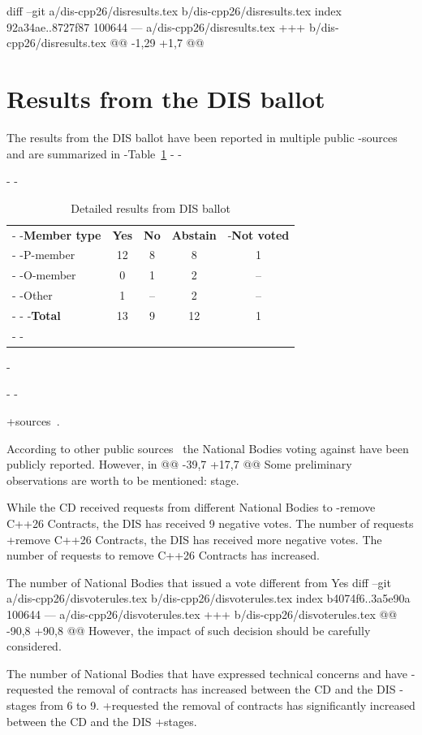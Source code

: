 diff --git a/dis-cpp26/disresults.tex b/dis-cpp26/disresults.tex
index 92a34ae..8727f87 100644
--- a/dis-cpp26/disresults.tex
+++ b/dis-cpp26/disresults.tex
@@ -1,29 +1,7 @@
 \section{Results from the DIS ballot}
 
 The results from the DIS ballot have been reported in multiple public
-sources~\cite{seacord:linkedin,ballot:trainit} and are summarized in
-Table~\ref{table:disresult}
-
-\begin{table}[htbp]
-\centering
-\begin{tabular}{|l|c|c|c|c|}
-\hline
-\textbf{Member type} & \textbf{Yes} & \textbf{No} & \textbf{Abstain} &
-\textbf{Not voted} \\
-\hline
-P-member & 12 & 8 & 8 & 1\\
-\hline
-O-member & 0 & 1 & 2 & --\\
-\hline
-Other & 1 & -- & 2 & -- \\
-\hline
-\hline
-\textbf{Total} & 13 & 9 & 12 & 1 \\
-\hline
-\end{tabular}
-\caption{Detailed results from DIS ballot}
-\label{table:disresult}
-\end{table}
+sources~\cite{seacord:linkedin,ballot:trainit}.
 
 According to other public sources~\cite{kowalska:lavx,ballot:hn,ballot:trainit}
 the National Bodies voting against have been publicly reported. However, in
@@ -39,7 +17,7 @@ Some preliminary observations are worth to be mentioned:
 stage.
 
   \item While the CD received requests from different National Bodies to
-remove C++26 Contracts, the DIS has received 9 negative votes. The number of requests
+remove C++26 Contracts, the DIS has received more negative votes. The number of requests
 to remove C++26 Contracts has increased.
 
   \item The number of National Bodies that issued a vote different from Yes
diff --git a/dis-cpp26/disvoterules.tex b/dis-cpp26/disvoterules.tex
index b4074f6..3a5e90a 100644
--- a/dis-cpp26/disvoterules.tex
+++ b/dis-cpp26/disvoterules.tex
@@ -90,8 +90,8 @@ However, the impact of such decision should be carefully considered.
 
 \item
 The number of National Bodies that have expressed technical concerns and have
-requested the removal of contracts has increased between the CD and the DIS
-stages from 6 to 9.
+requested the removal of contracts has significantly increased between the CD and the DIS
+stages.
 
